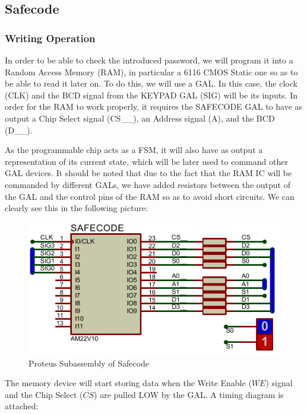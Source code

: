 \subsection{Safecode}

\subsubsection{Writing Operation}
\label{sec:WRITING_OPERATION}

In order to be able to check the introduced password, we will program it into a Random Access Memory (RAM), in particular a 6116 CMOS Static one so as to be able to read it later on. To do this, we will use a GAL. In this case, the clock (CLK) and the BCD signal from the KEYPAD GAL (SIG) will be its inputs. In order for the RAM to work properly, it requires the SAFECODE GAL to have as output a Chip Select signal (CS\_\_), an Address signal (A), and the BCD (D\_\_).\medskip

As the programmable chip acts as a FSM, it will also have as output a representation of its current state, which will be later used to command other GAL devices. It should be noted that due to the fact that the RAM IC will be commanded by different GALs, we have added resistors between the output of the GAL and the control pins of the RAM so as to avoid short circuits. We can clearly see this in the following picture:

\begin{figure}[H]
    \centering
    \includegraphics[scale = 1]{Graphics/SAFECODE/SAFECODE_PROTEUS.PDF}
    \caption{Proteus Subassembly of Safecode}
    \label{fig:SAFECODE_PROTEUS}
\end{figure}


\medskip
The memory device will start storing data when the Write Enable ($\overline{WE}$) signal and the Chip Select ($\overline{CS}$) are pulled LOW by the GAL. A timing diagram is attached:\medskip

